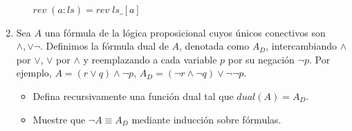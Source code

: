 \documentclass[letterpaper,11pt]{article}
\begin{document}
\begin{enumerate}
\begin{itemize}
\begin{center}
            $rev \; (a : ls) = rev \; ls\_[a]$
        \end{center}
    \end{itemize}

    \item Sea $A$ una fórmula de la lógica proposicional cuyos únicos 
    conectivos son $\land, \lor \neg$. Definimos la fórmula dual de $A$, 
    denotada como $A_{D}$, intercambiando $\land$ por $\lor$, $\lor$ por 
    $\land$ y reemplazando a cada variable $p$ por su negación $\neg p$.
    Por ejemplo, $A = (r \lor q) \land \neg p$, $A_{D} = (\neg r \land \neg q)
    \lor \neg \neg p$.
    \begin{itemize}
        \item Defina recursivamente una función dual tal que $dual(A) = A_{D}$.
        \item Muestre que $\neg A \equiv A_{D}$ mediante inducción sobre 
        fórmulas.
    \end{itemize}


\end{enumerate}
\end{document}
